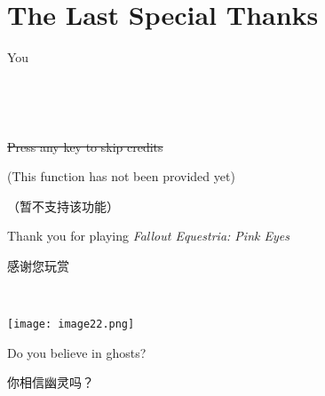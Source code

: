 

\fancyhf{} %

\fancyhead[LE,RO]{\thepage}


% 

~\vfill

\section*{The Last Special Thanks}

\begin{center}

    \Large You

\end{center}

~\vfill

\clearpage


~\vfill

\begin{center}

\begin{englishpar}
    \sout{Press any key to skip credits}
    
    (This function has not been provided yet)
\end{englishpar}


（暂不支持该功能）

\begin{englishpar}
    Thank you for playing \emph{Fallout Equestria: Pink Eyes}
\end{englishpar}

感谢您玩赏
\end{center}

~\vfill

\texttt{[image: image22.png]}

\begin{motto}
    Do you believe in ghosts?

    你相信幽灵吗？
\end{motto}

